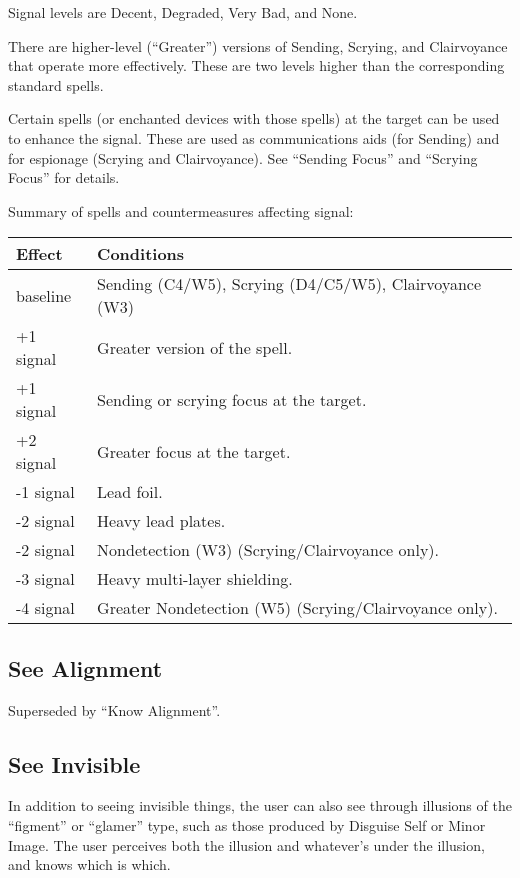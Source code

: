 Signal levels are Decent, Degraded, Very Bad, and None.

There are higher-level (``Greater'') versions of Sending, Scrying, and
Clairvoyance that operate more effectively. These are two levels higher
than the corresponding standard spells.

Certain spells (or enchanted devices with those spells) at the target can
be used to enhance the signal. These are used as communications aids (for
Sending) and for espionage (Scrying and Clairvoyance). See ``Sending Focus''
and ``Scrying Focus'' for details.

Summary of spells and countermeasures affecting signal:

\begin{tabular}{l|l}\hline
\textbf{Effect} & \textbf{Conditions} \\ \hline
%
baseline & Sending (C4/W5), Scrying (D4/C5/W5), Clairvoyance (W3) \\
\hline
%
+1 signal & Greater version of the spell. \\
+1 signal & Sending or scrying focus at the target. \\
+2 signal & Greater focus at the target. \\
\hline
%
-1 signal & Lead foil. \\
-2 signal & Heavy lead plates. \\
-2 signal & Nondetection (W3) (Scrying/Clairvoyance only). \\
-3 signal & Heavy multi-layer shielding. \\
-4 signal & Greater Nondetection (W5) (Scrying/Clairvoyance only). \\
\hline
%
\end{tabular}
%

%
\subsection{See Alignment}

Superseded by ``Know Alignment''.
%

%
\subsection{See Invisible}

In addition to seeing invisible things, the user can also see through
illusions of the ``figment'' or ``glamer'' type, such as those produced by
Disguise Self or Minor Image. The user perceives both the illusion and
whatever's under the illusion, and knows which is which.

